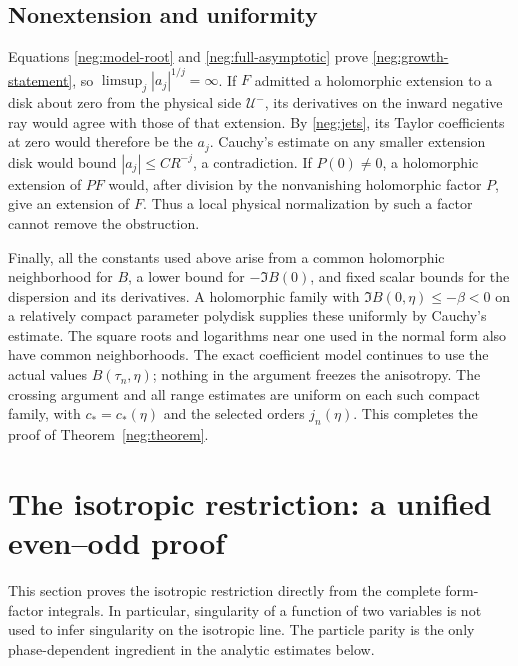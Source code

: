 \documentclass[11pt]{article}
\numberwithin{equation}{section}
\theoremstyle{definition}
\begin{document}
\subsection{Nonextension and uniformity}
\label{neg:conclusion}

Equations \eqref{neg:model-root} and
\eqref{neg:full-asymptotic} prove
\eqref{neg:growth-statement}, so
\(\limsup_j|a_j|^{1/j}=\infty\).
If \(F\) admitted a holomorphic extension to a disk about
zero from the physical side \(\mathcal U^-\), its derivatives
on the inward negative ray would agree with those of that
extension.  By \eqref{neg:jets}, its Taylor coefficients at
zero would therefore be the \(a_j\).  Cauchy's estimate on
any smaller extension disk would bound
\(|a_j|\le C R^{-j}\), a contradiction.
If \(P(0)\ne0\), a holomorphic extension of \(PF\) would,
after division by the nonvanishing holomorphic factor
\(P\), give an extension of \(F\).  Thus a local physical
normalization by such a factor cannot remove the obstruction.

Finally, all the constants used above arise from a common
holomorphic neighborhood for \(B\), a lower bound for
\(-\Im B(0)\), and fixed scalar bounds for the dispersion
and its derivatives.  A holomorphic family with
\(\Im B(0,\eta)\le-\beta<0\) on a relatively compact
parameter polydisk supplies these uniformly by Cauchy's
estimate.  The square roots and logarithms near one used
in the normal form also have common neighborhoods.
The exact coefficient model continues to use the actual
values \(B(\tau_n,\eta)\); nothing in the argument freezes
the anisotropy.  The crossing argument and all range
 estimates are uniform on each such compact family, with
 \(c_*=c_*(\eta)\) and the selected orders \(j_n(\eta)\).
This completes the proof of Theorem~\ref{neg:theorem}.


\section{The isotropic restriction: a unified even--odd proof}
\label{iso:section}

This section proves the isotropic restriction directly from the complete
form-factor integrals. In particular, singularity of a function of two
variables is not used to infer singularity on the isotropic line. The
particle parity is the only phase-dependent ingredient in the analytic
estimates below.
\end{document}
